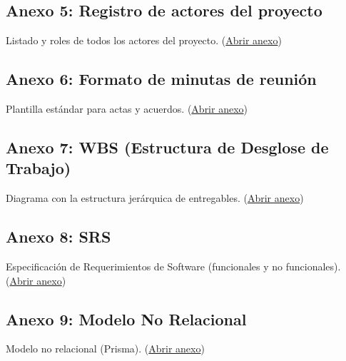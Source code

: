 \subsection*{Anexo 5: Registro de actores del proyecto}
\label{anexo:registro_actores}
\parbox{\linewidth}{%
Listado y roles de todos los actores del proyecto.
(\href{https://drive.google.com/file/d/1S9Q-E96NIDpG0EMDX2YKTTqEs6Od8mdS/view?usp=sharing}{Abrir anexo})
}

\subsection*{Anexo 6: Formato de minutas de reunión}
\label{anexo:formato_minutas}
\parbox{\linewidth}{%
Plantilla estándar para actas y acuerdos.
(\href{https://drive.google.com/drive/folders/1BHOoTcfT2bxG1wUy7kJ4X7yb6q9h27er?usp=sharing}{Abrir anexo})
}

\subsection*{Anexo 7: WBS (Estructura de Desglose de Trabajo)}
\label{anexo:wbs}
\parbox{\linewidth}{%
Diagrama con la estructura jerárquica de entregables.
(\href{https://drive.google.com/drive/folders/1ttuiMCmFBvJN9ji7XTXY-opBWwPszsYA?usp=sharing}{Abrir anexo})
}

\subsection*{Anexo 8: SRS}
\label{anexo:documento_srs}
\parbox{\linewidth}{%
Especificación de Requerimientos de Software (funcionales y no funcionales).
(\href{https://drive.google.com/file/d/1oJmhAV7PfzoFyCYmLh3L8nMICLeYXLhq/view?usp=sharing}{Abrir anexo})
}

\subsection*{Anexo 9: Modelo No Relacional}
\label{anexo:modelo_no_relacional}
\parbox{\linewidth}{%
Modelo no relacional (Prisma).
(\href{https://drive.google.com/file/d/1ib_2B1VA6txi9h-J2I136l8i4TbnE690/view?usp=sharing}{Abrir anexo})
}

